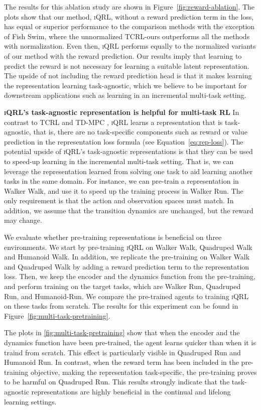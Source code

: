 \documentclass{article}
\theoremstyle{plain}
\theoremstyle{definition}
\theoremstyle{remark}
\newcommand{\our}{\textsc{iQRL}\xspace}
\begin{document}
The results for this ablation study are shown in Figure~\ref{fig:reward-ablation}. 
The plots show that our method, \our, without a reward prediction term in the loss, has equal or superior performance to the comparison methods with the exception of Fish Swim, where the unnormalized TCRL-ours outperforms all the methods with normalization. Even then, \our performs equally to the normalized variants of our method with the reward prediction. Our results imply that learning to predict the reward is not necessary for learning a suitable latent representation. The upside of not including the reward prediction head is that it makes learning the representation learning task-agnostic, which we believe to be   important for downstream applications such as learning in an incremental multi-task setting.

\textbf{\our's task-agnostic representation is helpful for multi-task RL}
In contrast to TCRL \cite{zhaoSimplifiedTemporalConsistency2023} and TD-MPC \cite{hansenTemporalDifferenceLearning2022}, \our learns a representation that is task-agnostic, that is, there are no task-specific components such as reward or value prediction in the representation loss formula (see Equation~\ref{eq:rep-loss}). The potential upside of \our's task-agnostic representations is that they can be used to speed-up learning in the incremental multi-task setting. That is, we can leverage the representation learned from solving one task to aid learning another tasks in the same domain. For instance, we can pre-train a representation in Walker Walk, and use it to speed up the training process in Walker Run. The only requirement is that the action and observation spaces must match. In addition, we assume that the transition dynamics are unchanged, but the reward may change.

We evaluate whether pre-training representations is beneficial on three environments. We start by pre-training \our on Walker Walk, Quadruped Walk and Humanoid Walk. In addition, we replicate the pre-training on Walker Walk and Quadruped Walk by adding a reward prediction term to the representation loss. Then, we keep the encoder and the dynamics function from the pre-training, and perform training on the target tasks, which are Walker Run, Quadruped Run, and Humanoid-Run. We compare the pre-trained agents to training \our on these tasks from scratch. The results for this experiment can be found in Figure~\ref{fig:multi-task-pretraining}.

The plots in \cref{fig:multi-task-pretraining} show that when the encoder and the dynamics function have been pre-trained, the agent learns quicker than when it is traind from scratch. This effect is particularly visible in Quadruped Run and Humanoid Run. In contrast, when the reward term has been included in the pre-training objective, making the representation task-specific, the pre-training proves to be harmful on Quadruped Run. This results strongly indicate that the task-agnostic representations are highly beneficial in the continual and lifelong learning settings.
\end{document}
